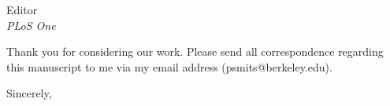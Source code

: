 \documentclass{letter}
\begin{document}
\begin{letter}{Editor \\ \textit{PLoS One}}

  Thank you for considering our work. Please send all correspondence regarding this manuscript to me via my email address (psmits@berkeley.edu).

  \closing{Sincerely,}


\end{letter}
\end{document}
